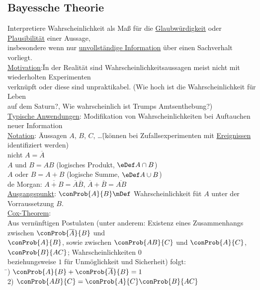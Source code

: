 \subsection{Bayessche Theorie}
\begin{tabbing}
Interpretiere Wahrscheinlichkeit als Maß für die \underline{Glaubwürdigkeit} oder \underline{Plausibilität} einer Aussage,\\ insbesondere wenn nur \underline{unvollständige Information} über einen Sachverhalt vorliegt.\\
\underline{Motivation}:\= In der Realität sind Wahrscheinlichkeitsaussagen meist nicht mit wiederholten Experimenten\\\> verknüpft oder diese sind unpraktikabel. (\glqq Wie hoch ist die Wahrscheinlichkeit für Leben\\\> auf dem Saturn?\grqq, \glqq Wie wahrscheinlich ist Trumps Amtsenthebung?\grqq)\\
\underline{Typische Anwendungen}: \= Modifikation von Wahrscheinlichkeiten bei Auftauchen neuer Information\\
\underline{Notation}: \= Aussagen $A$, $B$, $C$, \dots \=(können bei Zufallsexperimenten mit \underline{Ereignissen} identifiziert werden)\\
\> \glqq nicht $A$\grqq $= \overline{A}$\\
\> \glqq $A$ und $B$\grqq $= AB$ \>(logisches Produkt, $\eDef A \cap B$)\\
\> \glqq $A$ oder $B$\grqq $= A + B$ \>(logische Summe, $\eDef A\cup B$)\\
\> de Morgan: $\overline{A + B} = \overline{A} \overline{B}$, $\overline{A} + \overline{B} = \overline{AB}$\\
\underline{Ausgangspunkt}: $\conProb{A}{B} \mDef$ Wahrscheinlichkeit füt $A$ unter der Vorraussetzung $B$.\\
\underline{Cox-Theorem}:\\
Aus vernünftigen Postulaten (unter anderem: Existenz eines Zusammenhangs zwischen $\conProb{\overline{A}}{B}$ und\\ $\conProb{A}{B}$, sowie zwischen $\conProb{AB}{C}$ und $\conProb{A}{C}$, $\conProb{B}{AC}$; Wahrscheinlichkeiten $0$\\ beziehungsweise $1$ für Unmöglichkeit und Sicherheit) folgt:\\
\hspace{4em} \= ) \> $\conProb{A}{B} + \conProb{\overline{A}}{B} = 1$\\
2) \> $\conProb{AB}{C} = \conProb{A}{C} \conProb{B}{AC}$\\

\end{tabbing}
